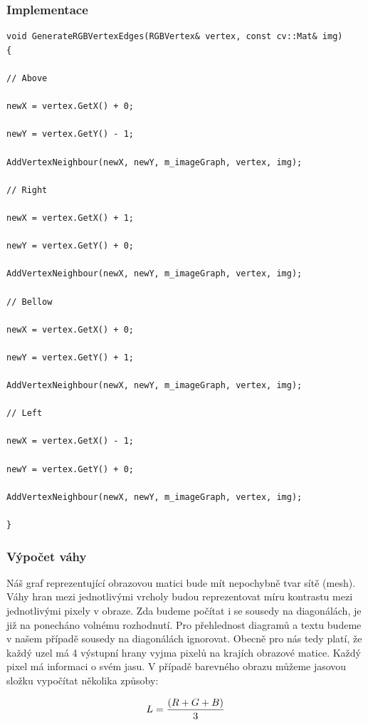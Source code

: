 \documentclass[czech, master, public, dept460, male, cpdeclaration, oneside]{diploma}
\begin{document}
\subsubsection{Implementace}
\begin{lstlisting}[label=src:Cpp,caption=Vytvoření obrazového grafu v jazyce C++]
void GenerateRGBVertexEdges(RGBVertex& vertex, const cv::Mat& img)
{

// Above

newX = vertex.GetX() + 0;

newY = vertex.GetY() - 1;

AddVertexNeighbour(newX, newY, m_imageGraph, vertex, img);

// Right

newX = vertex.GetX() + 1;

newY = vertex.GetY() + 0;

AddVertexNeighbour(newX, newY, m_imageGraph, vertex, img);

// Bellow

newX = vertex.GetX() + 0;

newY = vertex.GetY() + 1;

AddVertexNeighbour(newX, newY, m_imageGraph, vertex, img);

// Left

newX = vertex.GetX() - 1;

newY = vertex.GetY() + 0;

AddVertexNeighbour(newX, newY, m_imageGraph, vertex, img);

}
\end{lstlisting}

\subsubsection{Výpočet váhy}
Náš graf reprezentující obrazovou matici bude mít nepochybně tvar sítě (mesh). Váhy hran mezi jednotlivými vrcholy budou reprezentovat míru kontrastu mezi jednotlivými pixely v obraze. Zda budeme počítat i se sousedy na diagonálách, je již na ponecháno volnému rozhodnutí. Pro přehlednost diagramů a textu budeme v našem případě sousedy na diagonálách ignorovat. Obecně pro nás tedy platí, že každý uzel má 4 výstupní hrany vyjma pixelů na krajích obrazové matice. Každý pixel má informaci o svém jasu. V případě barevného obrazu můžeme jasovou složku vypočítat několika způsoby:\par

\begin{equation}
\vspace*{+3.0mm}
L = \frac{(R + G + B)}{3}
\end{equation}
\end{document}
